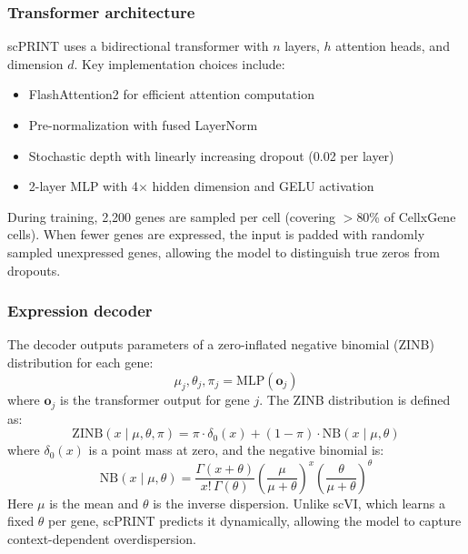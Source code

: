 \subsubsection{Transformer architecture}
\gls{scPRINT} uses a bidirectional transformer with $n$ layers, $h$ attention heads, and dimension $d$. Key implementation choices include:
\begin{itemize}
   \item FlashAttention2 for efficient attention computation
   \item Pre-normalization with fused LayerNorm
   \item Stochastic depth with linearly increasing dropout (0.02 per layer)
   \item 2-layer MLP with 4$\times$ hidden dimension and GELU activation
\end{itemize}

During training, 2,200 genes are sampled per cell (covering $>$80\% of CellxGene cells). When fewer genes are expressed, the input is padded with randomly sampled unexpressed genes, allowing the model to distinguish true zeros from dropouts.

\subsubsection{Expression decoder}
The decoder outputs parameters of a zero-inflated negative binomial (\gls{ZINB}) distribution for each gene:
\begin{equation}
\mu_j, \theta_j, \pi_j = \text{MLP}(\mathbf{o}_j)
\end{equation}
where $\mathbf{o}_j$ is the transformer output for gene $j$. The ZINB distribution is defined as:
\begin{equation}
\text{ZINB}(x \mid \mu, \theta, \pi) = \pi \cdot \delta_0(x) + (1 - \pi) \cdot \text{NB}(x \mid \mu, \theta)
\end{equation}
where $\delta_0(x)$ is a point mass at zero, and the negative binomial is:
\begin{equation}
\text{NB}(x \mid \mu, \theta) = \frac{\Gamma(x + \theta)}{x! \, \Gamma(\theta)} \left(\frac{\mu}{\mu + \theta}\right)^x \left(\frac{\theta}{\mu + \theta}\right)^\theta
\end{equation}
Here $\mu$ is the mean and $\theta$ is the inverse dispersion. Unlike \gls{scVI}, which learns a fixed $\theta$ per gene, \gls{scPRINT} predicts it dynamically, allowing the model to capture context-dependent overdispersion.

